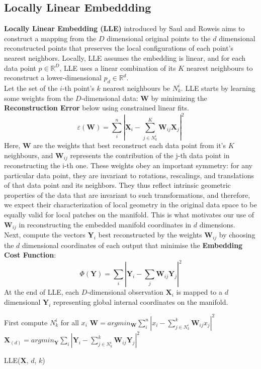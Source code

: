 \documentclass[12pt]{report}
\begin{document}
\newpage

\subsection{Locally Linear Embeddding}

\textbf{Locally Linear Embedding (LLE)} introduced by 
Saul and Roweis \cite{lle} aims to construct 
a mapping from the $D$ dimensional 
original points to the $d$ dimensional reconstructed points
that preserves the local configurations of each point's nearest neighbors. 
Locally, LLE assumes the embedding is linear, 
and for each data point $p \in \mathbb{R}^D$, 
LLE uses a linear combination of its $K$ nearest neighbours 
to reconstruct a lower-dimensional $p_d \in \mathbb{R}^d$. \\
Let the set of the $i$-th point's $k$ nearest neighbours be $N^i_k$.
LLE starts by learning some weights from the $D$-dimensional data: 
$\mathbf{W}$ by minimizing the \textbf{Reconstruction Error} 
below using constrained linear fits.
$$\varepsilon (\mathbf{W}) = \sum_i^n|\mathbf{X}_i - \sum_{j \in N^i_k}^K \mathbf{W}_{ij} \mathbf{X}_j|^2$$
Here, $\mathbf{W}$ are the weights that best reconstruct each 
data point from it's $K$ neighbours, and
$\mathbf{W}_{ij}$ represents the contribution 
of the j-th data point in reconstructing the i-th one.
These weights obey an important symmetry: for any particular data point,
they are invariant to rotations, rescalings, and translations
of that data point and its neighbors.
They thus reflect intrinsic geometric properties 
of the data that are invariant to such transformations,
and therefore, we expect their characterization of local geometry in the 
original data space to be equally valid for local patches on the manifold.
This is what motivates our use of $\mathbf{W}_{ij}$ in reconstructing
the embedded manifold coordinates in $d$ dimensions. \\
Next, compute the vectors $\mathbf{Y}_i$ best 
reconstructed by the weights $\mathbf{W}_{ij}$ 
by choosing the $d$ dimensional coordinates of each output
that minimise the \textbf{Embedding Cost Function}: 
$$\Phi(\mathbf{Y}) = \sum_i |\mathbf{Y}_i - \sum_j \mathbf{W}_{ij}\mathbf{Y}_j|^2$$
At the end of LLE, each $D$-dimensional observation $\mathbf{X}_i$ 
is mapped to a $d$ dimensional $\mathbf{Y}_i$ 
representing global internal coordinates on the manifold.\\
\begin{algorithm}
    First compute $N^i_k$ for all $x_i$\;
    $\mathbf{W} = argmin_{\mathbf{W}}\sum_i^n|x_i - \sum_{j \in N^i_k}^k \mathbf{W}_{ij} x_j|^2$\;
    $\mathbf{X}_{(d)} = argmin_{\mathbf{Y}}\sum_i |\mathbf{Y}_i - \sum_{j \in N^i_k}^k \mathbf{W}_{ij}\mathbf{Y}_j|^2$\;
    \caption{LLE($\mathbf{X}$, $d$, $k$)}
\end{algorithm}
\end{document}
